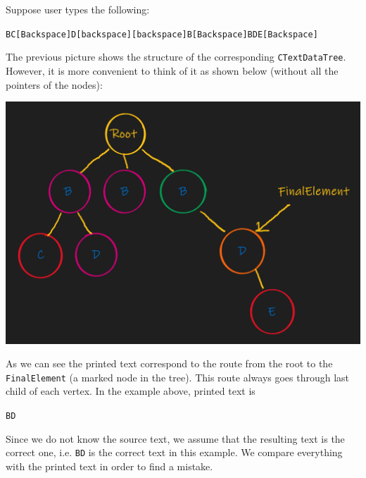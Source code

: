 \documentclass{article}
\begin{document}
Suppose user types the following:
\begin{center}
\verb"BC[Backspace]D[backspace][backspace]B[Backspace]BDE[Backspace]"
\end{center}
The previous picture shows the structure of the corresponding \verb"CTextDataTree". However, it is more convenient to think of it as shown below (without all the pointers of the nodes):
\begin{center}
\includegraphics[scale = 0.4]{Figures/TreePrimitives4a.png}
\end{center}
As we can see the printed text correspond to the route from the root to the \verb"FinalElement" (a marked node in the tree). This route always goes through last child of each vertex. In the example above, printed text is
\begin{center}
\verb"BD"
\end{center}
Since we do not know the source text, we assume that the resulting text is the correct one, i.e. \verb"BD" is the correct text in this example. We compare everything with the printed text in order to find a mistake.
\end{document}
